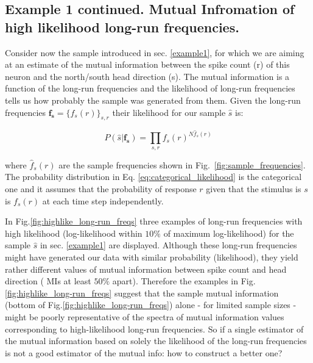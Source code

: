 \subsection{Example 1 continued. Mutual Infromation of high likelihood long-run frequencies.}\label{example1_con1}

Consider now the sample introduced in sec. \ref{example1}, for which we are aiming at an estimate of the mutual information between the spike count (r) of this neuron and the north/south head direction (s). The mutual information is a function of the long-run frequencies and the likelihood of long-run frequencies tells us how probably the sample was generated from them. Given the long-run frequencies $\mathbf{f_s}=\{f_s(r)\}_{s,r}$ their likelihood for our sample $\hat{s}$ is:

\begin{equation}
P(\hat{s}\vert \mathbf{f_s})=\prod_{s,r} f_s(r)^{N\hat{f}_s(r)}
\label{eq:categorical_likelihood}
\end{equation}

where $\hat{f}_s(r)$ are the sample frequencies shown in Fig.~\ref{fig:sample_frequencies}. The probability distribution in Eq. \eqref{eq:categorical_likelihood} is the categorical one and it assumes that the probability of response $r$ given that the stimulus is $s$ is  $f_s(r)$ at each time step independently.

In Fig.\ref{fig:highlike_long-run_freqs} three examples of long-run frequencies with high likelihood (log-likelihood within $10\%$ of maximum log-likelihood) for the sample $\hat{s}$ in sec. \ref{example1} are displayed. Although these long-run frequencies might have generated our data with similar probability (likelihood), they yield rather different values of mutual information between spike count and head direction ( MIs at least $50\%$ apart). Therefore the examples in Fig.\ref{fig:highlike_long-run_freqs} suggest that the sample mutual information (bottom of Fig.\ref{fig:highlike_long-run_freqs}) alone \-- for limited sample sizes \--   might be poorly representative of the spectra of mutual information values corresponding to high-likelihood long-run frequencies. So if a single estimator of the mutual information based on solely the likelihood of the long-run frequencies is not a good estimator of the mutual info: how to construct a better one?

